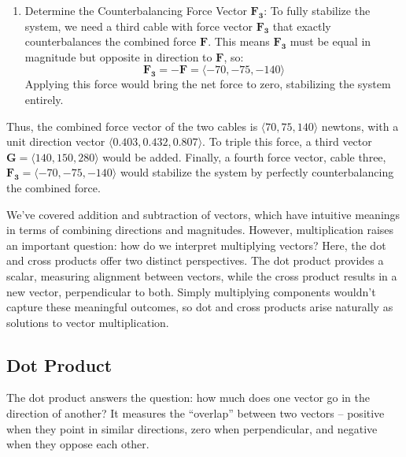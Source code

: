\begin{example}
\begin{solution}
\begin{enumerate}
    \item Determine the Counterbalancing Force Vector \( \mathbf{F_3} \): To fully stabilize the system, we need a third cable with force vector \( \mathbf{F_3} \) that exactly counterbalances the combined force \( \mathbf{F} \). This means \( \mathbf{F_3} \) must be equal in magnitude but opposite in direction to \( \mathbf{F} \), so:
    \[
    \mathbf{F_3} = -\mathbf{F} = \langle -70, -75, -140 \rangle
    \]
    Applying this force would bring the net force to zero, stabilizing the system entirely.

\end{enumerate}

\noindent Thus, the combined force vector of the two cables is \( \langle 70, 75, 140 \rangle \) newtons, with a unit direction vector \( \langle 0.403, 0.432, 0.807 \rangle \). To triple this force, a third vector \( \mathbf{G} = \langle 140, 150, 280 \rangle \) would be added. Finally, a fourth force vector, cable three, \( \mathbf{F_3} = \langle -70, -75, -140 \rangle \) would stabilize the system by perfectly counterbalancing the combined force.

\end{solution}
\end{example}
\exampleline


\vspace{1.3em}


\noindent We've covered addition and subtraction of vectors, which have intuitive meanings in terms of combining directions and magnitudes. However, multiplication raises an important question: how do we interpret multiplying vectors? Here, the dot and cross products offer two distinct perspectives. The dot product provides a scalar, measuring alignment between vectors, while the cross product results in a new vector, perpendicular to both. Simply multiplying components wouldn’t capture these meaningful outcomes, so dot and cross products arise naturally as solutions to vector multiplication.


\subsection*{Dot Product} 

\noindent The dot product answers the question: how much does one vector go in the direction of another? It measures the ``overlap'' between two vectors -- positive when they point in similar directions, zero when perpendicular, and negative when they oppose each other.

